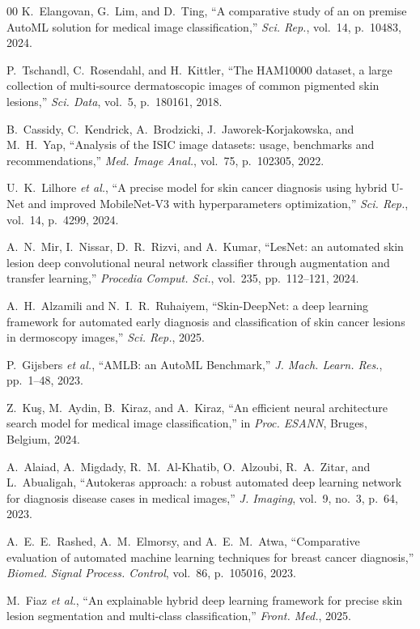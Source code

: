 \documentclass[conference]{IEEEtran}
\begin{document}
\begin{thebibliography}{00}
 K.~Elangovan, G.~Lim, and D.~Ting, ``A comparative study of an on premise AutoML solution for medical image classification,'' \textit{Sci. Rep.}, vol.~14, p.~10483, 2024.
 
 P.~Tschandl, C.~Rosendahl, and H.~Kittler, ``The HAM10000 dataset, a large collection of multi-source dermatoscopic images of common pigmented skin lesions,'' \textit{Sci. Data}, vol.~5, p.~180161, 2018.
 
 B.~Cassidy, C.~Kendrick, A.~Brodzicki, J.~Jaworek-Korjakowska, and M.~H.~Yap, ``Analysis of the ISIC image datasets: usage, benchmarks and recommendations,'' \textit{Med. Image Anal.}, vol.~75, p.~102305, 2022.
 
 U.~K.~Lilhore \textit{et al.}, ``A precise model for skin cancer diagnosis using hybrid U-Net and improved MobileNet-V3 with hyperparameters optimization,'' \textit{Sci. Rep.}, vol.~14, p.~4299, 2024.
 
 A.~N.~Mir, I.~Nissar, D.~R.~Rizvi, and A.~Kumar, ``LesNet: an automated skin lesion deep convolutional neural network classifier through augmentation and transfer learning,'' \textit{Procedia Comput. Sci.}, vol.~235, pp.~112--121, 2024.
 
 A.~H.~Alzamili and N.~I.~R.~Ruhaiyem, ``Skin-DeepNet: a deep learning framework for automated early diagnosis and classification of skin cancer lesions in dermoscopy images,'' \textit{Sci. Rep.}, 2025.
 
 P.~Gijsbers \textit{et al.}, ``AMLB: an AutoML Benchmark,'' \textit{J. Mach. Learn. Res.}, pp.~1--48, 2023.
 
 Z.~Ku\c{s}, M.~Aydin, B.~Kiraz, and A.~Kiraz, ``An efficient neural architecture search model for medical image classification,'' in \textit{Proc. ESANN}, Bruges, Belgium, 2024.
 
 A.~Alaiad, A.~Migdady, R.~M.~Al-Khatib, O.~Alzoubi, R.~A.~Zitar, and L.~Abualigah, ``Autokeras approach: a robust automated deep learning network for diagnosis disease cases in medical images,'' \textit{J. Imaging}, vol.~9, no.~3, p.~64, 2023.
 
 A.~E.~E.~Rashed, A.~M.~Elmorsy, and A.~E.~M.~Atwa, ``Comparative evaluation of automated machine learning techniques for breast cancer diagnosis,'' \textit{Biomed. Signal Process. Control}, vol.~86, p.~105016, 2023.
 
 M.~Fiaz \textit{et al.}, ``An explainable hybrid deep learning framework for precise skin lesion segmentation and multi-class classification,'' \textit{Front. Med.}, 2025.
 

\end{thebibliography}
\end{document}
